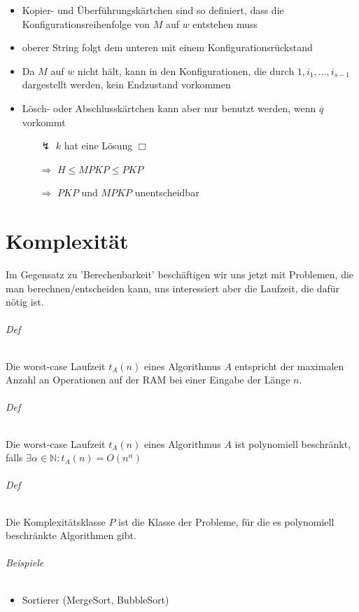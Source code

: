 \begin{itemize}
	\item Kopier- und Überführungskärtchen sind so definiert, dass die Konfigurationsreihenfolge von $M$ auf $w$ entstehen muss
	\item oberer String folgt dem unteren mit einem Konfigurationsrückstand
	\item Da $M$ auf $w$ nicht hält, kann in den Konfigurationen, die durch $1,i_1,\dots,i_{s-1}$ dargestellt werden, kein Endzustand vorkommen
	\item Lösch- oder Abschlusskärtchen kann aber nur benutzt werden, wenn $\overline{q}$ vorkommt
	\begin{itemize}

	
		\item[$\lightning$] $k$ hat eine Lösung $\Box$
		\item[$\Rightarrow$] $H \leq MPKP \leq PKP$
		\item[$\Rightarrow$] $PKP$ und $MPKP$ unentscheidbar
	\end{itemize}
\end{itemize}



\part{Komplexität}

Im Gegensatz zu 'Berechenbarkeit' beschäftigen wir uns jetzt mit Problemen, die man berechnen/entscheiden kann, uns interessiert aber die Laufzeit, die dafür nötig ist.

\paragraph*{Def} Die worst-case Laufzeit $t_A(n)$ eines Algorithmus $A$ entspricht der maximalen Anzahl an Operationen auf der RAM bei einer Eingabe der Länge $n$.

\paragraph*{Def} Die worst-case Laufzeit $t_A(n)$ eines Algorithmus $A$ ist polynomiell beschränkt, falls $\exists\alpha\in\mathbb{N}:t_A(n)=O(n^\alpha)$

\paragraph*{Def} Die Komplexitätsklasse $P$ ist die Klasse der Probleme, für die es polynomiell beschränkte Algorithmen gibt.

\paragraph*{Beispiele}
\begin{itemize}
	\item Sortierer (MergeSort, BubbleSort)
\end{itemize}